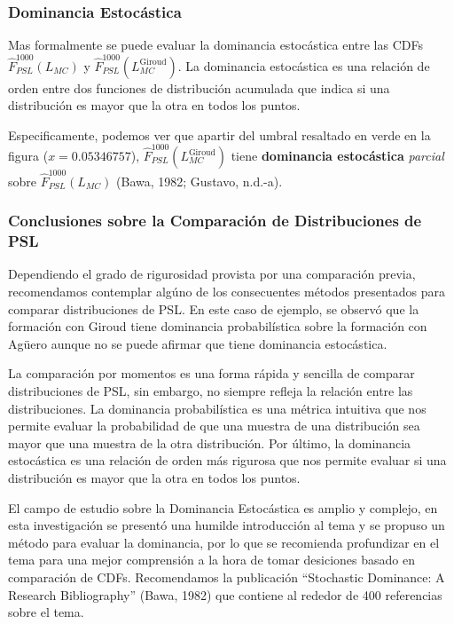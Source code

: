 \documentclass[
  a4paper,
]{article}
\begin{document}
\hypertarget{dominancia-estocuxe1stica}{%
\subsubsection{Dominancia Estocástica}\label{dominancia-estocuxe1stica}}

Mas formalmente se puede evaluar la dominancia estocástica entre las
CDFs \(\hat{F}^{1000}_{PSL}(L_{MC})\) y
\(\hat{F}^{1000}_{PSL}(L_{MC}^{\text{Giroud}})\). La dominancia
estocástica es una relación de orden entre dos funciones de distribución
acumulada que indica si una distribución es mayor que la otra en todos
los puntos.

Especificamente, podemos ver que apartir del umbral resaltado en verde
en la figura (\(x = 0.05346757\)),
\(\hat{F}^{1000}_{PSL}(L_{MC}^{\text{Giroud}})\) tiene
\textbf{dominancia estocástica} \emph{parcial} sobre
\(\hat{F}^{1000}_{PSL}(L_{MC})\) (Bawa, 1982; Gustavo, n.d.-a).

\hypertarget{conclusiones-sobre-la-comparaciuxf3n-de-distribuciones-de-psl}{%
\subsubsection{Conclusiones sobre la Comparación de Distribuciones de
PSL}\label{conclusiones-sobre-la-comparaciuxf3n-de-distribuciones-de-psl}}

Dependiendo el grado de rigurosidad provista por una comparación previa,
recomendamos contemplar algúno de los consecuentes métodos presentados
para comparar distribuciones de PSL. En este caso de ejemplo, se observó
que la formación con Giroud tiene dominancia probabilística sobre la
formación con Agüero aunque no se puede afirmar que tiene dominancia
estocástica.

La comparación por momentos es una forma rápida y sencilla de comparar
distribuciones de PSL, sin embargo, no siempre refleja la relación entre
las distribuciones. La dominancia probabilística es una métrica
intuitiva que nos permite evaluar la probabilidad de que una muestra de
una distribución sea mayor que una muestra de la otra distribución. Por
último, la dominancia estocástica es una relación de orden más rigurosa
que nos permite evaluar si una distribución es mayor que la otra en
todos los puntos.

El campo de estudio sobre la Dominancia Estocástica es amplio y
complejo, en esta investigación se presentó una humilde introducción al
tema y se propuso un método para evaluar la dominancia, por lo que se
recomienda profundizar en el tema para una mejor comprensión a la hora
de tomar desiciones basado en comparación de CDFs. Recomendamos la
publicación ``Stochastic Dominance: A Research Bibliography'' (Bawa,
1982) que contiene al rededor de 400 referencias sobre el tema.
\end{document}
